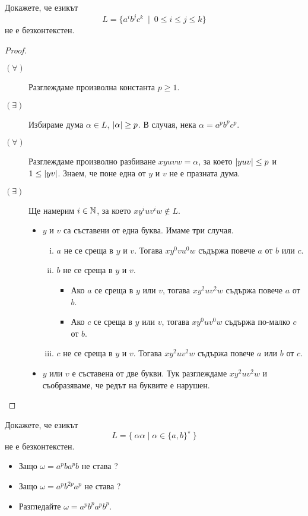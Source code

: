 \begin{problem}
  Докажете, че езикът
  \[L = \{a^ib^jc^k\ \mid\ 0 \leq i \leq j \leq k\}\]
  не е безконтекстен.
\end{problem}
\begin{proof}
  \begin{description}
  \item[$(\forall)$]
     Разглеждаме произволна константа $p \geq 1$.
   \item[$(\exists)$]
     Избираме дума $\alpha \in L$, $\vert{\alpha}\vert \geq p$.
     В случая, нека $\alpha = a^pb^pc^p$.
   \item[$(\forall)$]
     Разглеждаме произволно разбиване $xyuvw = \alpha$, за което $\vert{yuv}\vert \leq p$ и $1 \leq \vert{yv}\vert$.
     Знаем, че поне една от $y$ и $v$ не е празната дума.
   \item[$(\exists)$] Ще намерим $i \in \mathbb{N}$, за което $xy^iuv^iw \not\in L$.
    \begin{itemize}
    \item
      $y$ и $v$ са съставени от една буква.
      Имаме три случая.
      \begin{enumerate}[i)]
      \item
        $a$ не се среща в $y$ и $v$.
        Тогава $xy^0vu^0w$ съдържа повече $a$ от $b$ или $c$.
      \item
        $b$ не се среща в $y$ и $v$.
        \begin{itemize}
        \item 
          Ако $a$ се среща в $y$ или $v$, тогава $xy^2uv^2w$ съдържа повече $a$ от $b$.
        \item
          Ако $c$ се среща в $y$ или $v$, тогава $xy^0uv^0w$ съдържа по-малко $c$ от $b$.
        \end{itemize}
      \item
        $c$ не се среща в $y$ и $v$.
        Тогава $xy^2uv^2w$ съдържа повече $a$ или $b$ от $c$.
      \end{enumerate}      
     \item
       $y$ или $v$ е съставена от две букви.
       Тук разглеждаме $xy^2uv^2w$ и съобразяваме, че редът на буквите е нарушен.
     \end{itemize}    
   \end{description}
\end{proof}

\begin{problem}
  Докажете, че езикът 
  \[L = \{\ \alpha\alpha\mid \alpha\in \{a,b\}^\star\ \}\]
  не е безконтекстен.
\end{problem}
\begin{hint}
  \begin{itemize}
  \item 
    Защо $\omega = a^pba^pb$ не става ?
  \item
    Защо $\omega = a^pb^{2p}a^p$ не става ?
  \item
    Разгледайте $\omega = a^pb^pa^pb^p$.
  \end{itemize}
\end{hint}

